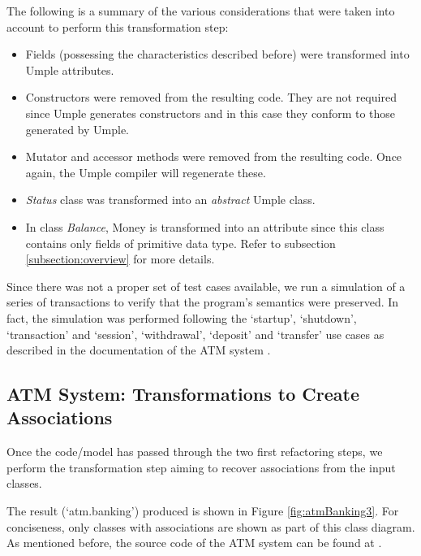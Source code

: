The following is a summary of the various considerations that were taken into account to perform this transformation step:

\begin{itemize}
\item Fields (possessing the characteristics described before) were transformed into Umple attributes. 

\item Constructors were removed from the resulting code. They are not required since Umple generates constructors and in this case they conform to those generated by Umple. 

\item Mutator and accessor methods were removed from the resulting code. Once again, the Umple compiler will regenerate these. 

\item \textit{Status} class was transformed into an \textit{abstract} Umple class. 

\item In class \textit{Balance}, Money is transformed into an attribute since this class contains only fields of primitive data type. Refer to subsection \ref{subsection:overview} for more details.
\end{itemize}

Since there was not a proper set of test cases available, we run a simulation of a series of transactions to verify that the program's semantics were preserved. In fact, the simulation was performed following the  `startup', `shutdown', `transaction' and `session', `withdrawal', `deposit' and `transfer' use cases as described in the documentation of the ATM system \cite{atmsystem}.


\subsection{ATM System: Transformations to Create Associations}

Once the code/model has  passed through the two first refactoring steps, we perform the transformation step aiming to recover associations from the input classes.

The result (`atm.banking') produced is shown in Figure \ref{fig:atmBanking3}. For conciseness, only classes with associations are shown as part of this class diagram. As mentioned before, the source code of the ATM system can be found at \cite{atmsystem}.

